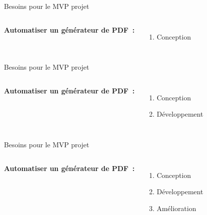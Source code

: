 \begin{frame}{Besoins pour le MVP projet}
    

    \begin{columns}
        \textbf{Automatiser un générateur de PDF~:}
        \begin{enumerate}
            \item Conception
        \end{enumerate}
        
    \end{columns}
    
\end{frame}

\begin{frame}{Besoins pour le MVP projet}
    

    \begin{columns}
        \textbf{Automatiser un générateur de PDF~:}
        \begin{enumerate}
            \item Conception
            \item Développement
        \end{enumerate}
        
    \end{columns}
    
\end{frame}

\begin{frame}{Besoins pour le MVP projet}
    

    \begin{columns}
        \textbf{Automatiser un générateur de PDF~:}
        \begin{enumerate}
            \item Conception
            \item Développement
            \item Amélioration
        \end{enumerate}
        
    \end{columns}
    
\end{frame}

